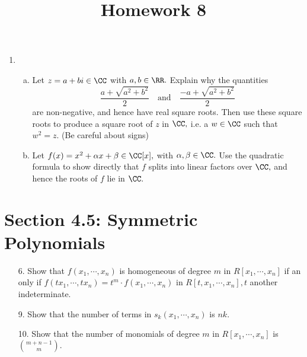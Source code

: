 \documentclass{article}
\begin{document}
\title{Homework 8}
\maketitle
\thispagestyle{fancy}

\begin{enumerate}
	\item 
		\begin{enumerate}[(a)]
			\item Let $z=a+bi\in\CC$ with $a, b\in\RR.$ Explain why the quantities
				\[\frac{a+\sqrt{a^2+b^2}}{2}\quad\text{and}\quad\frac{-a+\sqrt{a^2+b^2}}{2}\]
				are non-negative, and hence have real square roots. Then use these square roots to produce a square root of $z$ in $\CC,$ i.e. a $w\in\CC$ such that $w^2=z.$ (Be careful about signs)

			\item Let $f(x)=x^2+\alpha x+\beta\in\CC[x],$ with $\alpha, \beta\in\CC.$ Use the quadratic formula to show directly that $f$ splits into linear factors over $\CC,$ and hence the roots of $f$ lie in $\CC.$
				
		\end{enumerate}
		
\end{enumerate}

\section*{Section 4.5: Symmetric Polynomials}

\begin{itemize}
	\item[6.] Show that $f(x_1, \cdots, x_n)$ is homogeneous of degree $m$ in $R[x_1, \cdots, x_n]$ if an only if $f(tx_1, \cdots, tx_n)=t^m \cdot f(x_1, \cdots, x_n)$ in $R[t, x_1, \cdots, x_n], t$ another indeterminate.

	\item[9.] Show that the number of terms in $s_k(x_1, \cdots, x_n)$ is $nk.$

	\item[10.] Show that the number of monomials of degree $m$ in $R[x_1, \cdots, x_n]$ is $\binom{m+n-1}{m}.$

		
\end{itemize}
\end{document}
